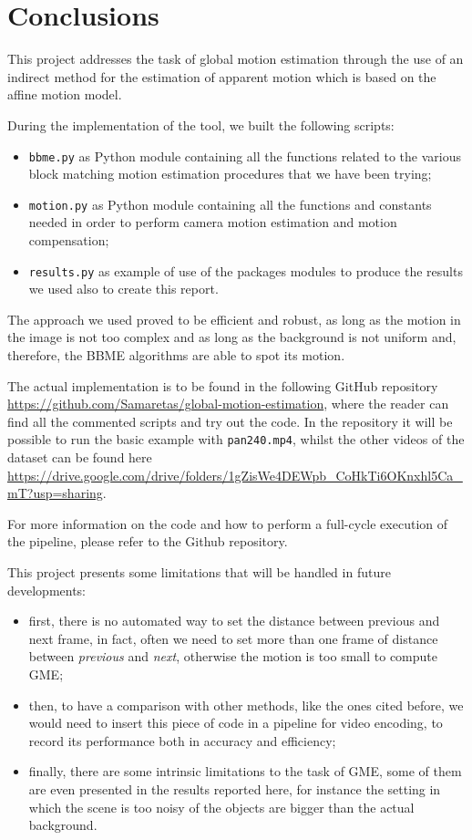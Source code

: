 \section{Conclusions}
\label{sec:conclusions}

This project addresses the task of global motion estimation through the use of an indirect method for the estimation of apparent motion which is based on the affine motion model.

During the implementation of the tool, we built the following scripts:
\begin{itemize}
    \item \texttt{bbme.py} as Python module containing all the functions related to the various block matching motion estimation procedures that we have been trying;
    \item \texttt{motion.py} as Python module containing all the functions and constants needed in order to perform camera motion estimation and motion compensation;
    \item \texttt{results.py} as example of use of the packages modules to produce the results we used also to create this report.  
\end{itemize}

The approach we used proved to be efficient and robust, as long as the motion in the image is not too complex and as long as the background is not uniform and, therefore, the BBME algorithms are able to spot its motion.

The actual implementation is to be found in the following GitHub repository \url{https://github.com/Samaretas/global-motion-estimation}, where the reader can find all the commented scripts and try out the code.
In the repository it will be possible to run the basic example with \texttt{pan240.mp4}, whilst the other videos of the dataset can be found here \url{https://drive.google.com/drive/folders/1gZisWe4DEWpb_CoHkTi6OKnxhl5Ca_mT?usp=sharing}.

For more information on the code and how to perform a full-cycle execution of the pipeline, please refer to the Github repository.

This project presents some limitations that will be handled in future developments:
\begin{itemize}
    \item first, there is no automated way to set the distance between previous and next frame, in fact, often we need to set more than one frame of distance between \textit{previous} and \textit{next}, otherwise the motion is too small to compute GME;
    \item then, to have a comparison with other methods, like the ones cited before, we would need to insert this piece of code in a pipeline for video encoding, to record its performance both in accuracy and efficiency;
    \item finally, there are some intrinsic limitations to the task of GME, some of them are even presented in the results reported here, for instance the setting in which the scene is too noisy of the objects are bigger than the actual background.
\end{itemize}